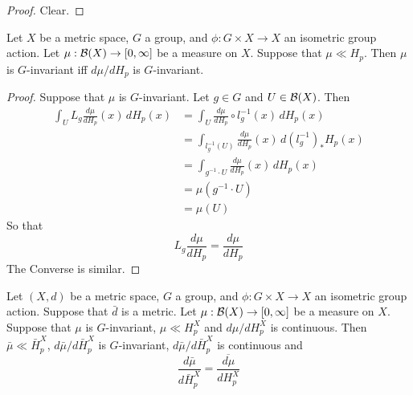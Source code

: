 \documentclass{book}
\begin{document}
	\begin{proof}
	Clear.
	\end{proof}
	
	\begin{ex}
	Let $X$ be a metric space, $G$ a group, and $\phi: G \times X \rightarrow X$ an isometric group action. Let $\mu: \mathcal{B}(X) \rightarrow [0, \infty]$ be a measure on $X$. Suppose that $\mu \ll H_p$. Then $\mu$ is $G$-invariant iff $d\mu /d H_p$ is $G$-invariant.
	\end{ex}	
	
	\begin{proof}
	Suppose that $\mu$ is $G$-invariant. Let $g \in G$ and $U \in \mathcal{B}(X)$. Then 
	\begin{align*}
	\int_U L_g \frac{d\mu}{d H_p}(x) \, d  H_p (x)
	&= \int_U \frac{d\mu}{d H_p} \circ l_{g}^{-1}(x) \, d  H_p(x) \\
	&= \int_{l_{g}^{-1}( U) } \frac{d\mu}{d H_p}(x) \, d (l_{g}^{-1})_*H_p(x) \\
	&= \int_{g^{-1} \cdot U } \frac{d\mu}{d H_p}(x) \, d H_p(x) \\
	&= \mu(g^{-1} \cdot U) \\
	&= \mu (U)
	\end{align*}
	So that \begin{equation*}
	L_g \frac{d\mu}{d H_p} = \frac{d\mu}{d H_p}
	\end{equation*}
	The Converse is similar.
	\end{proof}
	
	\begin{ex}
	Let $(X, d)$ be a metric space, $G$ a group, and $\phi: G \times X \rightarrow X$ an isometric group action. Suppose that $\bar{d}$ is a metric. Let $\mu: \mathcal{B}(X) \rightarrow [0, \infty]$ be a measure on $X$. Suppose that $\mu$ is $G$-invariant, $\mu \ll H_p^X$ and $d\mu / dH_p^X$ is continuous. Then $\bar{\mu} \ll \bar{H}_p^X$, $d\bar{\mu}/d \bar{H}_p^X$ is $G$-invariant, $d\bar{\mu}/d \bar{H}_p^X$ is continuous and 
	\begin{equation*}
	\frac{d \bar{\mu}}{d \bar{H}_p^X} = \overline{\frac{d \mu}{d H_p^X}}
	\end{equation*}
	\end{ex}
	
\end{document}

